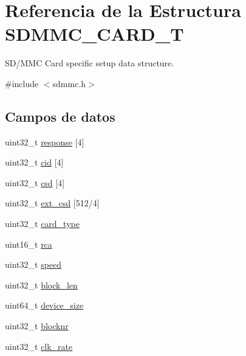 \hypertarget{struct_s_d_m_m_c___c_a_r_d___t}{}\section{Referencia de la Estructura S\+D\+M\+M\+C\+\_\+\+C\+A\+R\+D\+\_\+T}
\label{struct_s_d_m_m_c___c_a_r_d___t}


S\+D/\+M\+MC Card specific setup data structure.  




{\ttfamily \#include $<$sdmmc.\+h$>$}

\subsection*{Campos de datos}
\begin{DoxyCompactItemize}
\item 
uint32\+\_\+t \hyperlink{struct_s_d_m_m_c___c_a_r_d___t_af8dec199f0e5b3e398572384f304a9b9}{response} \mbox{[}4\mbox{]}
\item 
uint32\+\_\+t \hyperlink{struct_s_d_m_m_c___c_a_r_d___t_aa4aa8ca8ef253ab8b2e4cf237ec93f0f}{cid} \mbox{[}4\mbox{]}
\item 
uint32\+\_\+t \hyperlink{struct_s_d_m_m_c___c_a_r_d___t_a19d36c084d93f976533cb7f3747617a7}{csd} \mbox{[}4\mbox{]}
\item 
uint32\+\_\+t \hyperlink{struct_s_d_m_m_c___c_a_r_d___t_ab0fd82a526e95803db0f7c06ed428f8f}{ext\+\_\+csd} \mbox{[}512/4\mbox{]}
\item 
uint32\+\_\+t \hyperlink{struct_s_d_m_m_c___c_a_r_d___t_a21344812dcaa40c24fcd631b7b8915ea}{card\+\_\+type}
\item 
uint16\+\_\+t \hyperlink{struct_s_d_m_m_c___c_a_r_d___t_a507feb31eecad24ea6e75566817e4961}{rca}
\item 
uint32\+\_\+t \hyperlink{struct_s_d_m_m_c___c_a_r_d___t_a220859a8b5da0232739a11cbe7f79fc5}{speed}
\item 
uint32\+\_\+t \hyperlink{struct_s_d_m_m_c___c_a_r_d___t_a8fb8b36eb880c86464ec8baf1b5c202a}{block\+\_\+len}
\item 
uint64\+\_\+t \hyperlink{struct_s_d_m_m_c___c_a_r_d___t_a316beaaf7640003a2c28fbfa5fc222dd}{device\+\_\+size}
\item 
uint32\+\_\+t \hyperlink{struct_s_d_m_m_c___c_a_r_d___t_a90cee613097870780dda8c7f8a7e21b7}{blocknr}
\item 
uint32\+\_\+t \hyperlink{struct_s_d_m_m_c___c_a_r_d___t_a428a59667f1ee33f4287059b902fad00}{clk\+\_\+rate}

\end{DoxyCompactItemize}
